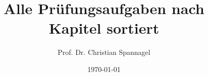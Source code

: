 \documentclass{cssheet}
\title{Alle Prüfungsaufgaben nach Kapitel sortiert}
\author{Prof. Dr. Christian Spannagel}
\date{\today}
\begin{document}
\printtitle
	








\end{document}
